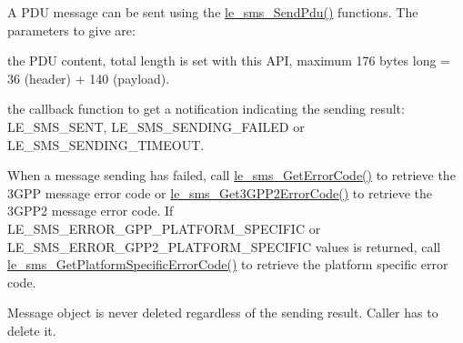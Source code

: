 A P\+D\+U message can be sent using the \hyperlink{le__sms__interface_8h_a8e6e66ff683717a8cd3eb20fc6efe6e0}{le\+\_\+sms\+\_\+\+Send\+Pdu()} functions. The parameters to give are\+:
\begin{DoxyItemize}
\item the P\+D\+U content, total length is set with this A\+P\+I, maximum 176 bytes long = 36 (header) + 140 (payload).
\item the callback function to get a notification indicating the sending result\+: L\+E\+\_\+\+S\+M\+S\+\_\+\+S\+E\+N\+T, L\+E\+\_\+\+S\+M\+S\+\_\+\+S\+E\+N\+D\+I\+N\+G\+\_\+\+F\+A\+I\+L\+E\+D or L\+E\+\_\+\+S\+M\+S\+\_\+\+S\+E\+N\+D\+I\+N\+G\+\_\+\+T\+I\+M\+E\+O\+U\+T.
\end{DoxyItemize}

When a message sending has failed, call \hyperlink{le__sms__interface_8h_a9ee511af99c91383344debf532fae1ae}{le\+\_\+sms\+\_\+\+Get\+Error\+Code()} to retrieve the 3\+G\+P\+P message error code or \hyperlink{le__sms__interface_8h_a46afe91bbded617ad444ea29a9dd910a}{le\+\_\+sms\+\_\+\+Get3\+G\+P\+P2\+Error\+Code()} to retrieve the 3\+G\+P\+P2 message error code. If L\+E\+\_\+\+S\+M\+S\+\_\+\+E\+R\+R\+O\+R\+\_\+G\+P\+P\+\_\+\+P\+L\+A\+T\+F\+O\+R\+M\+\_\+\+S\+P\+E\+C\+I\+F\+I\+C or L\+E\+\_\+\+S\+M\+S\+\_\+\+E\+R\+R\+O\+R\+\_\+G\+P\+P2\+\_\+\+P\+L\+A\+T\+F\+O\+R\+M\+\_\+\+S\+P\+E\+C\+I\+F\+I\+C values is returned, call \hyperlink{le__sms__interface_8h_a9cfbc2131df38f99272a71bf05cb1254}{le\+\_\+sms\+\_\+\+Get\+Platform\+Specific\+Error\+Code()} to retrieve the platform specific error code.

Message object is never deleted regardless of the sending result. Caller has to delete it.


